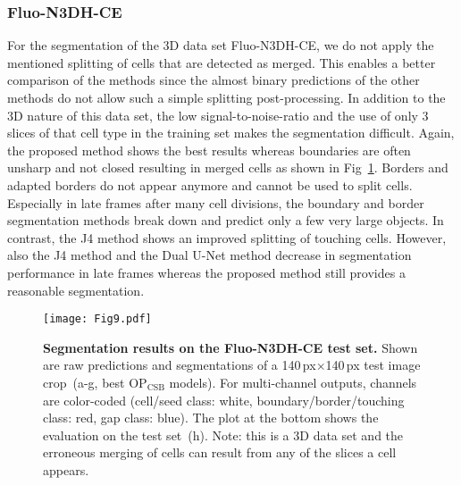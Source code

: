 \documentclass[10pt,letterpaper]{article}
\begin{document}
\subsubsection*{Fluo-N3DH-CE}
For the segmentation of the 3D data set Fluo-N3DH-CE, we do not apply the mentioned splitting of cells that are detected as merged. This enables a better comparison of the methods since the almost binary predictions of the other methods do not allow such a simple splitting post-processing. In addition to the 3D nature of this data set, the low signal-to-noise-ratio and the use of only 3 slices of that cell type in the training set makes the segmentation difficult. Again, the proposed method shows the best results whereas boundaries are often unsharp and not closed resulting in merged cells as shown in Fig~\ref{fig:fluo-n3dh-ce-results}. Borders and adapted borders do not appear anymore and cannot be used to split cells. Especially in late frames after many cell divisions, the boundary and border segmentation methods break down and predict only a few very large objects. In contrast, the J4 method shows an improved splitting of touching cells. However, also the J4 method and the Dual U-Net method decrease in segmentation performance in late frames whereas the proposed method still provides a reasonable segmentation.
\begin{figure}
\begin{adjustwidth}{-2.25in}{0in}
\centering
\texttt{[image: Fig9.pdf]}
\caption{\textbf{Segmentation results on the Fluo-N3DH-CE test set.} Shown are raw predictions and segmentations of a 140\,px$\times$140\,px test image crop~(a-g, best $\mathrm{OP}_{\text{CSB}}$ models). For multi-channel outputs, channels are color-coded (cell/seed class: white, boundary/border/touching class: red, gap class: blue). The plot at the bottom shows the evaluation on the test set~(h). Note: this is a 3D data set and the erroneous merging of cells can result from any of the slices a cell appears.}
\label{fig:fluo-n3dh-ce-results}
\end{adjustwidth}
\end{figure}
\end{document}
